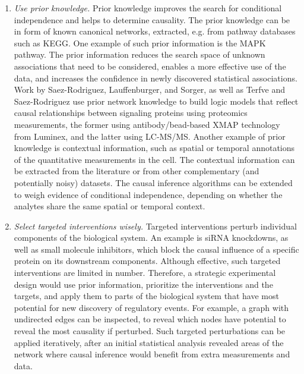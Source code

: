\documentclass[journal=jacsat,manuscript=article]{achemso}
\def\added#1{{\color{blue} #1}}
\begin{document}
\begin{enumerate}
\item \textit{Use prior knowledge.} Prior knowledge improves the search for conditional independence and helps to determine causality. The prior knowledge can be in form of known canonical networks, extracted, e.g. from pathway databases such as KEGG. One example of such prior information is the MAPK pathway. The prior information reduces the search space of unknown associations that need to be considered, enables a more effective use of the data, and increases the confidence in newly discovered statistical associations.  \added{Work by Saez-Rodriguez, Lauffenburger, and Sorger\cite{SaezRodriguez:2009hb}, as well as Terfve and Saez-Rodriguez\cite{Terfve:2015kw} use prior network knowledge to build logic models that reflect causal relationships between signaling proteins using proteomics measurements, the former using antibody/bead-based XMAP technology from Luminex, and the latter using LC-MS/MS.} Another example of prior knowledge is contextual information, such as spatial or temporal annotations of the quantitative measurements in the cell. The contextual information can be extracted from the literature or from other complementary (and potentially noisy) datasets. The causal inference algorithms can be extended to weigh evidence of conditional independence, depending on whether the analytes share the same spatial or temporal context. 

\item \textit{Select targeted interventions wisely.} Targeted interventions perturb individual components of the biological system.  An example is \added{siRNA knockdowns, as well as} small molecule inhibitors, which block the causal influence of a specific protein on its downstream components. Although effective, such targeted interventions are limited in number. Therefore, a strategic experimental design would use prior information, prioritize the interventions and the targets, and apply them to parts of the biological system that have most potential for new discovery of regulatory events.  For example, a graph with undirected edges can be inspected, to reveal which nodes have potential to reveal the most causality if perturbed. Such targeted perturbations can be applied iteratively, after an initial statistical analysis revealed areas of the network where causal inference would benefit from extra measurements and data. 



\end{enumerate}
\end{document}
